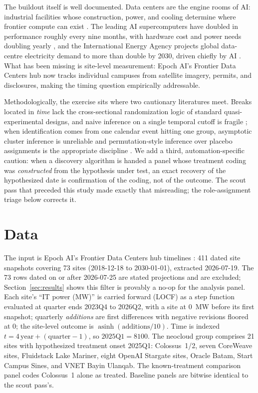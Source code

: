 \documentclass[11pt]{article}
\begin{document}
The buildout itself is well documented. Data centers are the engine rooms of
AI: industrial facilities whose construction, power, and cooling determine
where frontier compute can exist \cite{pilzheim2023}. The leading AI
supercomputers have doubled in performance roughly every nine months, with
hardware cost and power needs doubling yearly \cite{pilz2025}, and the
International Energy Agency projects global data-centre electricity demand to
more than double by 2030, driven chiefly by AI \cite{iea2025}. What has been
missing is site-level measurement: Epoch AI's Frontier Data Centers hub
\cite{epochdc} now tracks individual campuses from satellite imagery, permits,
and disclosures, making the timing question empirically addressable.

Methodologically, the exercise sits where two cautionary literatures meet.
Breaks located in \emph{time} lack the cross-sectional randomization logic of
standard quasi-experimental designs, and naive inference on a single temporal
cutoff is fragile \cite{hausmanrapson2018}; when identification comes from one
calendar event hitting one group, asymptotic cluster inference is unreliable
and permutation-style inference over placebo assignments is the appropriate
discipline \cite{conleytaber2011}. We add a third, automation-specific
caution: when a discovery algorithm is handed a panel whose treatment coding
was \emph{constructed} from the hypothesis under test, an exact recovery of
the hypothesized date is confirmation of the coding, not of the outcome. The
scout pass that preceded this study made exactly that misreading; the
role-assignment triage below corrects it.

\section{Data}\label{sec:data}

The input is Epoch AI's Frontier Data Centers hub timelines \cite{epochdc}:
411 dated site snapshots covering 73 sites (2018-12-18 to 2030-01-01),
extracted 2026-07-19. The 73 rows dated on or after 2026-07-25 are stated
projections and are excluded; Section~\ref{sec:results} shows this filter is
provably a no-op for the analysis panel. Each site's ``IT power (MW)'' is
carried forward (LOCF) as a step function evaluated at quarter ends 2023Q4 to
2026Q2, with a site at 0~MW before its first snapshot; quarterly
\emph{additions} are first differences with negative revisions floored at 0;
the site-level outcome is $\operatorname{asinh}(\text{additions}/10)$. Time is
indexed $t = 4\,\text{year} + (\text{quarter}-1)$, so $2025\text{Q1} = 8100$.
The neocloud group comprises 21 sites with hypothesized treatment onset
2025Q1: Colossus~1/2, seven CoreWeave sites, Fluidstack Lake Mariner, eight
OpenAI Stargate sites, Oracle Batam, Start Campus Sines, and VNET Bayin
Ulanqab. The known-treatment comparison panel codes Colossus~1 alone as
treated. Baseline panels are bitwise identical to the scout pass's.
\end{document}
